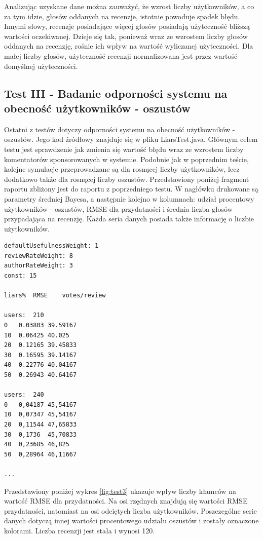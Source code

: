 Analizując uzyskane dane można zauważyć, że wzrost liczby użytkowników, a co za tym idzie, głosów oddanych na recenzje, istotnie powoduje spadek błędu. Innymi słowy, recenzje posiadające więcej głosów posiadają użyteczność bliższą wartości oczekiwanej. Dzieje się tak, ponieważ wraz ze wzrostem liczby głosów oddanych na recenzję, rośnie ich wpływ na wartość wyliczanej użyteczności. Dla małej liczby głosów, użyteczność recenzji normalizowana jest przez wartość domyślnej użyteczności.

\subsection{Test III - Badanie odporności systemu na obecność użytkowników - oszustów}

Ostatni z testów dotyczy odporności systemu na obecność użytkowników - oszustów. Jego kod źródłowy znajduje się w pliku LiarsTest.java. Głównym celem testu jest sprawdzenie jak zmienia się wartość błędu wraz ze wzrostem liczby komentatorów sponsorowanych w systemie. Podobnie jak w poprzednim teście, kolejne symulacje przeprowadzane są dla rosnącej liczby użytkowników, lecz dodatkowo także dla rosnącej liczby oszustów. Przedstawiony poniżej fragment raportu zbliżony jest do raportu z poprzedniego testu. W nagłówku drukowane są parametry średniej Bayesa, a następnie kolejno w kolumnach: udział procentowy użytkowników - oszustów, RMSE dla przydatności i średnia liczba głosów przypadająca na recenzję. Każda seria danych posiada także informację o liczbie użytkowników.

\begin{lstlisting}
defaultUsefulnessWeight: 1
reviewRateWeight: 8
authorRateWeight: 3
const: 15

liars%	RMSE	votes/review

users:	210
0	0.03803	39.59167
10	0.06425	40.025
20	0.12165	39.45833
30	0.16595	39.14167
40	0.22776	40.04167
50	0.26943	40.64167

users:	240	
0	0,04187	45,54167
10	0,07347	45,54167
20	0,11544	47,65833
30	0,1736	45,70833
40	0,23685	46,825
50	0,28964	46,11667

...
\end{lstlisting}

Przedstawiony poniżej wykres \ref{fig:test3} ukazuje wpływ liczby kłamców na wartość RMSE dla przydatności. Na osi rzędnych znajdują się wartości RMSE przydatności, natomiast na osi odciętych liczba użytkowników. Poszczególne serie danych dotyczą innej wartości procentowego udziału oszustów i zostały oznaczone kolorami. Liczba recenzji jest stała i wynosi 120.

